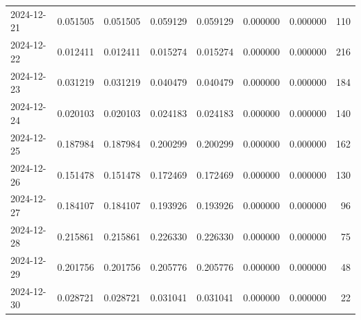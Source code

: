 \begin{tabular}{lrrrrrrr}
2024-12-21 & 0.051505 & 0.051505 & 0.059129 & 0.059129 & 0.000000 & 0.000000 & 110 \\
2024-12-22 & 0.012411 & 0.012411 & 0.015274 & 0.015274 & 0.000000 & 0.000000 & 216 \\
2024-12-23 & 0.031219 & 0.031219 & 0.040479 & 0.040479 & 0.000000 & 0.000000 & 184 \\
2024-12-24 & 0.020103 & 0.020103 & 0.024183 & 0.024183 & 0.000000 & 0.000000 & 140 \\
2024-12-25 & 0.187984 & 0.187984 & 0.200299 & 0.200299 & 0.000000 & 0.000000 & 162 \\
2024-12-26 & 0.151478 & 0.151478 & 0.172469 & 0.172469 & 0.000000 & 0.000000 & 130 \\
2024-12-27 & 0.184107 & 0.184107 & 0.193926 & 0.193926 & 0.000000 & 0.000000 & 96 \\
2024-12-28 & 0.215861 & 0.215861 & 0.226330 & 0.226330 & 0.000000 & 0.000000 & 75 \\
2024-12-29 & 0.201756 & 0.201756 & 0.205776 & 0.205776 & 0.000000 & 0.000000 & 48 \\
2024-12-30 & 0.028721 & 0.028721 & 0.031041 & 0.031041 & 0.000000 & 0.000000 & 22 \\
\bottomrule
\end{tabular}

